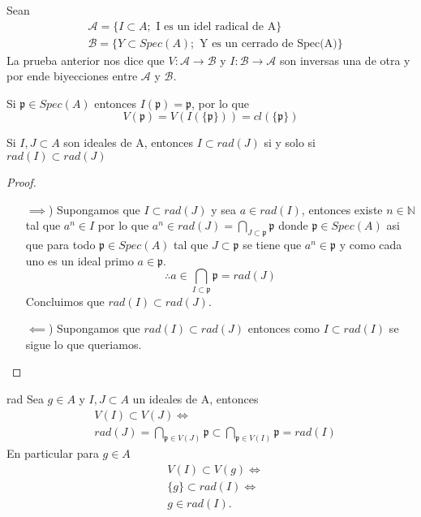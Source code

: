 \documentclass[14pt]{extarticle}
\begin{document}
\begin{observacion}{}{}
    Sean 
    \begin{align*}
        &\mathcal{A} = \{I \subset A; \mbox{ I es un idel radical de A}\}\\
        &\mathcal{B} = \{Y \subset Spec(A); \mbox{ Y es un cerrado de Spec(A)}\}
    \end{align*}
    La prueba anterior nos dice que $V:\mathcal{A} \rightarrow \mathcal{B}$ y 
    $I: \mathcal{B} \rightarrow \mathcal{A}$ son inversas una de otra y por ende
    biyecciones entre $\mathcal{A}$ y $\mathcal{B}$.
\end{observacion}

\begin{observacion}{}{}
    Si $\mathfrak{p}\in Spec(A)$ entonces
    $I({\mathfrak{p}})=\mathfrak{p}$, 
    por lo que
    $$V(\mathfrak{p})
    =V(I(\{\mathfrak{p}\}))
    =cl(\{\mathfrak{p}\})$$
\end{observacion}

\begin{lema}{}{}
    Si $I, J \subset A$ son ideales de A, entonces 
    $I \subset rad(J)$ si y solo si $rad(I)\subset rad(J)$
\end{lema}
\begin{proof}
    \begin{enumerate}
        \item[$\implies$)]Supongamos que $I \subset rad(J)$ y sea $a \in rad(I)$,
        entonces existe $n \in \mathbb{N}$ tal que $a^n \in I$ por lo que 
        $a^n \in rad(J) = \bigcap_{J\subset \mathfrak{p}}\mathfrak{p}$ donde $\mathfrak{p}\in Spec(A)$
        asi que para todo $\mathfrak{p} \in Spec(A)$ tal que $J\subset \mathfrak{p}$
        se tiene que $a^n \in \mathfrak{p}$ y como cada uno es un ideal primo
        $a\in \mathfrak{p}$.
        $$\therefore a \in \bigcap_{I\subset \mathfrak{p}}\mathfrak{p} = rad(J)$$
        Concluimos que $rad(I) \subset rad(J)$.
        \item[$\impliedby$)]Supongamos que $rad(I)\subset rad(J)$ entonces como 
        $I\subset rad(I)$ se sigue lo que queriamos.
    \end{enumerate}
\end{proof}

\begin{corolario}{}{rad}
    Sea $g \in A$ y $I, J \subset A$ un ideales de A,
    entonces 
    \begin{align*}
        &V(I) \subset V(J) \iff \\
        &rad(J)= \bigcap_{\mathfrak{p} \in V(J)} \mathfrak{p}\subset \bigcap_{\mathfrak{p}\in V(I)}\mathfrak{p} =rad(I)
    \end{align*}
    En particular para $g\in A$
    \begin{align*}
        &V(I) \subset V(g) \iff \\ 
        &\{g\} \subset rad(I) \iff \\
        &g \in rad(I).
    \end{align*}
\end{corolario}
\end{document}
